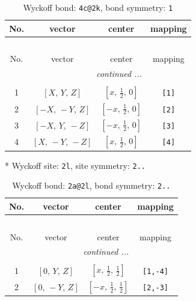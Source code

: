 \documentclass[fleqn,8pt]{jsarticle}
\begin{document}
\begin{longtable}{cccc}
\caption{Wyckoff bond: {\tt 4c@2k}, bond symmetry: {\tt 1}}
 \\
 \hline \hline
No. & vector & center & mapping \\ \hline \endfirsthead

\multicolumn{3}{l}{\tablename\ \thetable{}} \\
 \hline \hline
No. & vector & center & mapping \\ \hline \endhead

 \hline \hline
\multicolumn{3}{r}{\footnotesize\it continued ...} \\ \endfoot

 \hline \hline
\multicolumn{3}{r}{} \\ \endlastfoot

1 & $\left[ X,\, Y,\, Z \right]$ & $\left[ x,\, \frac{1}{2},\, 0 \right]$ & {\tt [1]} \\ \hline
2 & $\left[ - X,\, - Y,\, Z \right]$ & $\left[ - x,\, \frac{1}{2},\, 0 \right]$ & {\tt [2]} \\ \hline
3 & $\left[ - X,\, Y,\, - Z \right]$ & $\left[ - x,\, \frac{1}{2},\, 0 \right]$ & {\tt [3]} \\ \hline
4 & $\left[ X,\, - Y,\, - Z \right]$ & $\left[ x,\, \frac{1}{2},\, 0 \right]$ & {\tt [4]} \\
\end{longtable}
* Wyckoff site: {\tt 2l}, site symmetry: {\tt 2..}
\renewcommand{\arraystretch}{1.2}
\begin{longtable}{cccc}
\caption{Wyckoff bond: {\tt 2a@2l}, bond symmetry: {\tt 2..}}
 \\
 \hline \hline
No. & vector & center & mapping \\ \hline \endfirsthead

\multicolumn{3}{l}{\tablename\ \thetable{}} \\
 \hline \hline
No. & vector & center & mapping \\ \hline \endhead

 \hline \hline
\multicolumn{3}{r}{\footnotesize\it continued ...} \\ \endfoot

 \hline \hline
\multicolumn{3}{r}{} \\ \endlastfoot

1 & $\left[ 0,\, Y,\, Z \right]$ & $\left[ x,\, \frac{1}{2},\, \frac{1}{2} \right]$ & {\tt [1,-4]} \\ \hline
2 & $\left[ 0,\, - Y,\, Z \right]$ & $\left[ - x,\, \frac{1}{2},\, \frac{1}{2} \right]$ & {\tt [2,-3]} \\
\end{longtable}
\end{document}
